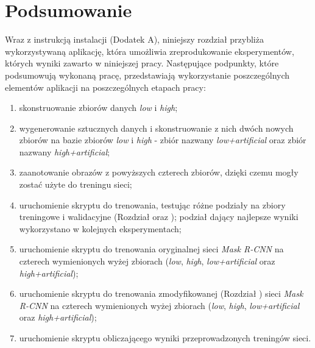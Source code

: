 \section{Podsumowanie}
Wraz z instrukcją instalacji (Dodatek A), niniejszy rozdział przybliża wykorzystywaną aplikację, która umożliwia zreprodukowanie eksperymentów, których wyniki zawarto w niniejszej pracy.
Następujące podpunkty, które podsumowują wykonaną pracę, przedstawiają wykorzystanie poszczególnych elementów aplikacji na poszczególnych etapach pracy:

\begin{enumerate}
 \item skonstruowanie zbiorów danych \textit{low} i \textit{high};
 \item wygenerowanie sztucznych danych i skonstruowanie z nich dwóch nowych zbiorów na bazie zbiorów \textit{low} i \textit{high} - zbiór nazwany \textit{low+artificial} oraz zbiór nazwany \textit{high+artificial};
 \item zaanotowanie obrazów z powyższych czterech zbiorów, dzięki czemu mogły zostać użyte do treningu sieci;
 \item uruchomienie skryptu do trenowania, testując różne podziały na zbiory treningowe i walidacyjne (Rozdział  oraz ); podział dający najlepsze wyniki wykorzystano w kolejnych eksperymentach;
 \item uruchomienie skryptu do trenowania oryginalnej sieci \textit{Mask R-CNN} na czterech wymienionych wyżej zbiorach (\textit{low}, \textit{high}, \textit{low+artificial} oraz \textit{high+artificial});
 \item uruchomienie skryptu do trenowania zmodyfikowanej (Rozdział ) sieci \textit{Mask R-CNN} na czterech wymienionych wyżej zbiorach (\textit{low}, \textit{high}, \textit{low+artificial} oraz \textit{high+artificial});
 \item uruchomienie skryptu obliczającego wyniki przeprowadzonych treningów sieci.
\end{enumerate}
